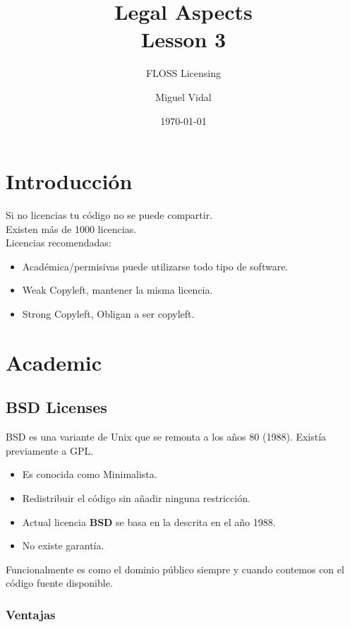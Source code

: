 \documentclass[11pt]{scrartcl}
\title{\textbf{Legal Aspects\\
				Lesson 3}}
\subtitle{FLOSS Licensing}
\author{Miguel Vidal}
\date{\today}
\begin{document}
\maketitle

\section{Introducci\'on}

Si no licencias tu c\'odigo no se puede compartir.\\
Existen m\'as de 1000 licencias.\\
Licencias recomendadas:
\begin{itemize}

	\item Acad\'emica/permisivas puede utilizarse todo tipo de software.
	\item Weak Copyleft, mantener la misma licencia.
	\item Strong Copyleft, Obligan a ser copyleft.
\end{itemize}

\section{Academic}

\subsection{BSD Licenses}

BSD es una variante de Unix que se remonta a los a\~nos 80 (1988). Exist\'ia previamente a GPL.

\begin{itemize}

	\item Es conocida como Minimalista.
	\item Redistribuir el c\'odigo sin a\~nadir ninguna restricci\'on.
	\item Actual licencia \textbf{BSD} se basa en la descrita en el a\~no 1988.
	\item No existe garant\'ia.
\end{itemize}

Funcionalmente es como el dominio p\'ublico siempre y cuando contemos con el c\'odigo fuente disponible.

\subsubsection{Ventajas}
\end{document}
